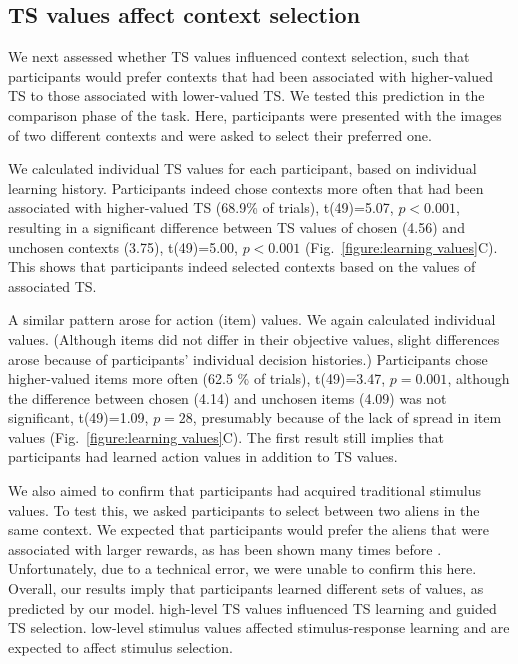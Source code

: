 \documentclass[10pt, letterpaper]{article}
\begin{document}
\subsection{TS values affect context selection}

We next assessed whether TS values influenced context selection, such that participants would prefer contexts that had been associated with higher-valued TS to those associated with lower-valued TS. We tested this prediction in the comparison phase of the task. Here, participants were presented with the images of two different contexts and were asked to select their preferred one. 

We calculated individual TS values for each participant, based on individual learning history. Participants indeed chose contexts more often that had been associated with higher-valued TS (68.9\% of trials), t(49)=5.07, $p<0.001$, resulting in a significant difference between TS values of chosen (4.56) and unchosen contexts (3.75), t(49)=5.00, $p<0.001$ (Fig.~\ref{figure:learning values}C). This shows that participants indeed selected contexts based on the values of associated TS.

A similar pattern arose for action (item) values. We again calculated individual values. (Although items did not differ in their objective values, slight differences arose because of participants' individual decision histories.) Participants chose higher-valued items more often (62.5 \% of trials), t(49)=3.47, $p=0.001$, although the difference between chosen (4.14) and unchosen items (4.09) was not significant, t(49)=1.09, $p=28$, presumably because of the lack of spread in item values (Fig.~\ref{figure:learning values}C). The first result still implies that participants had learned action values in addition to TS values.

We also aimed to confirm that participants had acquired traditional stimulus values. To test this, we asked participants to select between two aliens in the same context. We expected that participants would prefer the aliens that were associated with larger rewards, as has been shown many times before \cite{frank_by_2004}. Unfortunately, due to a technical error, we were unable to confirm this here. Overall, our results imply that participants learned different sets of values, as predicted by our model. high-level TS values influenced TS learning and guided TS selection. low-level stimulus values affected stimulus-response learning and are expected to affect stimulus selection.
\end{document}
